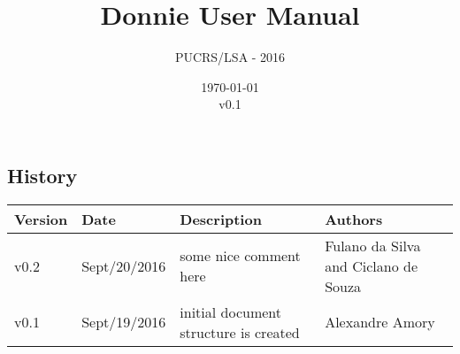 \documentclass[11pt,a4paper,final]{report}
\author{PUCRS/LSA - 2016}
\title{Donnie User Manual}
\date{\today\\v0.1}
\begin{document}
\pagestyle{empty}

\maketitle 

\tableofcontents






\begin{landscape}
\chapter{History}
\label{sec:history}

\thispagestyle{empty}

\begin{tabular}{p{1.5cm}p{3cm}p{12cm}p{6cm}}
	\toprule
	 \textbf{Version} & \textbf{Date} & \textbf{Description}  & \textbf{Authors}\\
	\midrule
v0.2 & Sept/20/2016 & some nice comment here & Fulano da Silva and Ciclano de Souza  \\
v0.1 & Sept/19/2016 & initial document structure is created & Alexandre Amory  \\
	\bottomrule
\end{tabular}

\end{landscape}
\end{document}
